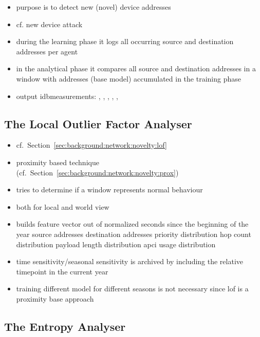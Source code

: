 \begin{itemize}
	\item purpose is to detect new (novel) device addresses
	\item cf. new device attack
	\item during the learning phase it logs all occurring source and destination addresses per agent
	\item in the analytical phase it compares all source and destination addresses in a window with addresses (base model) accumulated in the training phase
	\item output \glspl{idbmeasurement}: , , , , , 
\end{itemize}

\subsection{The Local Outlier Factor Analyser}
\label{sec:concept:anal:lof}

\begin{itemize}
	\item cf.~Section~\ref{sec:background:network:novelty:lof}
	\item proximity based technique (cf.~Section~\ref{sec:background:network:novelty:prox})
	\item tries to determine if a window represents normal behaviour
	\item both for local and world view
	\item builds feature vector out of
		\subitem normalized seconds since the beginning of the year
		\subitem source addresses
		\subitem destination addresses
		\subitem priority distribution
		\subitem hop count distribution
		\subitem payload length distribution
		\subitem \gls{apci} usage distribution
	\item time sensitivity/seasonal sensitivity is archived by including the relative timepoint in the current year
	\item training different model for different seasons is not necessary since \gls{lof} is a proximity base approach
\end{itemize}

\subsection{The Entropy Analyser}
\label{sec:concept:anal:entropy}


